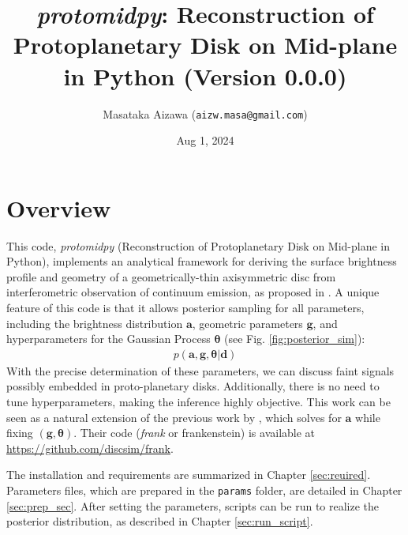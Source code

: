 \documentclass{report}
\title{{\it protomidpy}: Reconstruction of Protoplanetary Disk on Mid-plane in Python  (Version 0.0.0)}
\author{Masataka Aizawa (\texttt{aizw.masa@gmail.com})}
\date{Aug 1, 2024}
\begin{document}
\maketitle

\tableofcontents

\chapter{Overview}
This code, {\it protomidpy} (Reconstruction of Protoplanetary Disk on Mid-plane in Python), implements an analytical framework for deriving the surface brightness profile and geometry of a geometrically-thin axisymmetric disc from interferometric observation of continuum emission, as proposed in \cite{aizawa2024}. A unique feature of this code is that it allows posterior sampling for all parameters, including the brightness distribution $\bm{a}$, geometric parameters $\bm{g}$, and hyperparameters for the Gaussian Process $\bm{\theta}$ (see Fig. \ref{fig:posterior_sim}):
\begin{eqnarray}
p(\bm{a}, \bm{g} , \bm{\theta} |\bm{d})
\end{eqnarray}
With the precise determination of these parameters, we can discuss faint signals possibly embedded in proto-planetary disks. Additionally, there is no need to tune hyperparameters, making the inference highly objective. This work can be seen as a natural extension of the previous work by \cite{jennings2020}, which solves for $\bm{a}$ while fixing $(\bm{g} , \bm{\theta})$. Their code (\textit{frank} or frankenstein) is available at \url{https://github.com/discsim/frank}.

The installation and requirements are summarized in Chapter \ref{sec:reuired}. Parameters files, which are prepared in the \texttt{params} folder, are detailed in Chapter \ref{sec:prep_sec}. After setting the parameters, scripts can be run to realize the posterior distribution, as described in Chapter \ref{sec:run_script}.
\end{document}
